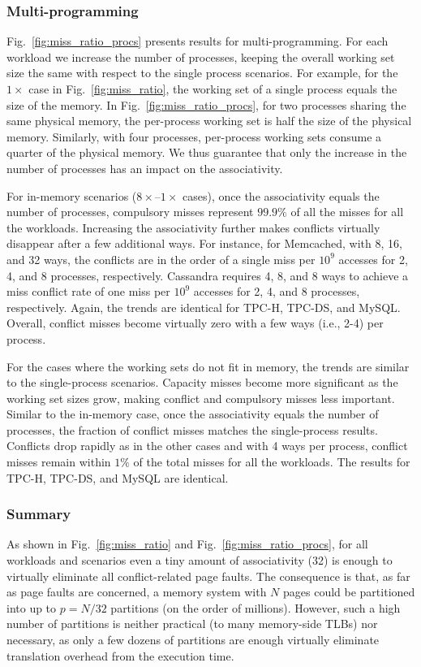 \subsubsection{Multi-programming}
Fig.~\ref{fig:miss_ratio_procs} presents results for multi-programming. For each workload we increase the number of processes, keeping the overall working set size the same with respect to the single process scenarios. For example, for the $1\times$ case in Fig.~\ref{fig:miss_ratio}, the working set of a single process equals the size of the memory. In Fig.~\ref{fig:miss_ratio_procs}, for two processes sharing the same physical memory, the per-process working set is half the size of the physical memory. Similarly, with four processes, per-process working sets consume a quarter of the physical memory. We thus guarantee that only the increase in the number of processes has an impact on the associativity. 

For in-memory scenarios ($8\times$--$1\times$ cases), once the associativity equals the number of processes, compulsory misses represent $99.9\%$ of all the misses for all the workloads. Increasing the associativity further makes conflicts virtually disappear after a few additional ways. For instance, for Memcached, with 8, 16, and 32 ways, the conflicts are in the order of a single miss per $10^{9}$ accesses for 2, 4, and 8 processes, respectively. Cassandra requires 4, 8, and 8 ways to achieve a miss conflict rate of one miss per $10^{9}$ accesses for 2, 4, and 8 processes, respectively. Again, the trends are identical for TPC-H, TPC-DS, and MySQL. Overall, conflict misses become virtually zero with a few ways (i.e., 2-4) per process.

For the cases where the working sets do not fit in memory, the trends are similar to the single-process scenarios. Capacity misses become more significant as the working set sizes grow, making conflict and compulsory misses less important. Similar to the in-memory case, once the associativity equals the number of processes, the fraction of conflict misses matches the single-process results. Conflicts drop rapidly as in the other cases and with 4 ways per process, conflict misses remain within $1\%$ of the total misses for all the workloads. The results for TPC-H, TPC-DS, and MySQL are identical.

\subsubsection{Summary}
As shown in Fig.~\ref{fig:miss_ratio} and Fig.~\ref{fig:miss_ratio_procs}, for all workloads and scenarios even a tiny amount of associativity (32) is enough to virtually eliminate all conflict-related page faults. The consequence is that, as far as page faults are concerned, a memory system with $N$ pages could be partitioned into up to $p=N/32$ partitions (on the order of millions). However, such a high number of partitions is neither practical (to many memory-side TLBs) nor necessary, as only a few dozens of partitions are enough virtually eliminate translation overhead from the execution time. 


